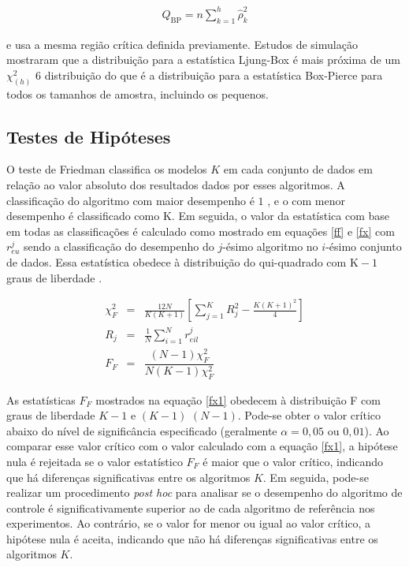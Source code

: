  \begin{eqnarray}
 	Q_{\mathrm{BP}}=n \sum_{k=1}^h \hat{\rho}_k^2
 \end{eqnarray}
 
\noindent e usa a mesma região crítica definida previamente.
Estudos de simulação mostraram que a distribuição para a estatística Ljung-Box é mais próxima de um $\chi^2_{(h)}$ $6$ distribuição do que é a distribuição para a estatística Box-Pierce para todos os tamanhos de amostra, incluindo os pequenos.
 
 
\subsection{Testes de Hip\'oteses}
 
O teste de Friedman classifica os modelos $K$ em cada conjunto de dados em relação ao valor absoluto dos resultados dados por esses algoritmos. A classificação do algoritmo com maior desempenho é $1$ , e o com menor desempenho é classificado como $\mathrm{K}$. Em seguida, o valor da estatística com base em todas as classificações é calculado como mostrado em equações \eqref{ff} e \eqref{fx} com $r_{e u}^j$ sendo a classificação do desempenho do $j$-ésimo algoritmo no $i$-ésimo conjunto de dados. Essa estatística obedece à distribuição do qui-quadrado com $\mathrm{K}-1$ graus de liberdade \cite{Liu2022}.
 
 \begin{eqnarray}
 	\chi_F^2 & =&\frac{12 N}{K(K+1)}\left[\sum_{j=1}^K R_j^2-\frac{K(K+1)^2}{4}\right] \label{ff}\\
 	R_j & =&\frac{1}{N} \sum_{i=1}^N r_{e i l}^j \label{fx}\\
 	F_F&=&\dfrac{(N-1) \chi_F^2}{N(K-1) \chi_F^2}\label{fx1}
 \end{eqnarray}
 
 
As estatísticas $F_F$ mostrados na equação \eqref{fx1} obedecem à distribuição F com graus de liberdade $K-1$ e $(K-1)$ $(N-1)$. Pode-se obter o valor crítico abaixo do nível de significância especificado (geralmente $\alpha = 0,05$ ou $0,01$). Ao comparar esse valor crítico com o valor calculado com a equação \eqref{fx1}, a hipótese nula é rejeitada se o valor estatístico $F_F$ é maior que o valor crítico, indicando que há diferenças significativas entre os algoritmos $K$. Em seguida, pode-se realizar um procedimento \textit{post hoc} para analisar se o desempenho do algoritmo de controle é significativamente superior ao de cada algoritmo de referência nos experimentos. Ao contrário, se o valor for menor ou igual ao valor crítico, a hipótese nula é aceita, indicando que não há diferenças significativas entre os algoritmos $K$.
  
